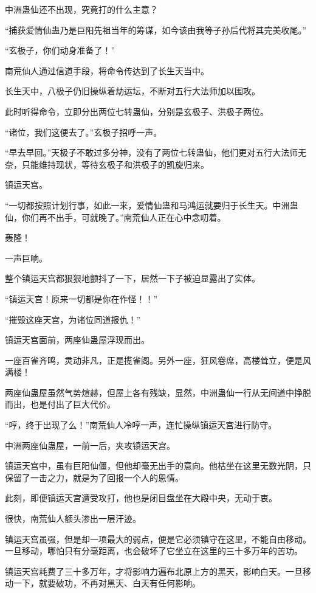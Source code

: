 \begin{this_body}
中洲蛊仙还不出现，究竟打的什么主意？

“捕获爱情仙蛊乃是巨阳先祖当年的筹谋，如今该由我等子孙后代将其完美收尾。”

“玄极子，你们动身准备了！”

南荒仙人通过信道手段，将命令传达到了长生天当中。

长生天中，八极子仍旧操纵着劫运坛，不断对五行大法师加以围攻。

此时听得命令，立即分出两位七转蛊仙，分别是玄极子、洪极子两位。

“诸位，我们这便去了。”玄极子招呼一声。

“早去早回。”天极子不敢过多分神，没有了两位七转蛊仙，他们更对五行大法师无奈，只能维持现状，等待玄极子和洪极子的凯旋归来。

镇运天宫。

“一切都按照计划行事，如此一来，爱情仙蛊和马鸿运就要归于长生天。中洲蛊仙，你们再不出手，可就晚了。”南荒仙人正在心中念叨着。

轰隆！

一声巨响。

整个镇运天宫都狠狠地颤抖了一下，居然一下子被迫显露出了实体。

“镇运天宫！原来一切都是你在作怪！！”

“摧毁这座天宫，为诸位同道报仇！”

镇运天宫面前，两座仙蛊屋浮现而出。

一座百雀齐鸣，灵动非凡，正是揽雀阁。另外一座，狂风卷席，高楼耸立，便是风满楼！

两座仙蛊屋虽然气势煊赫，但屋上各有残缺，显然，中洲蛊仙一行从无间道中挣脱而出，也是付出了巨大代价。

“哼，终于出现了么！”南荒仙人冷哼一声，连忙操纵镇运天宫进行防守。

中洲两座仙蛊屋，一前一后，夹攻镇运天宫。

镇运天宫中，虽有巨阳仙僵，但他却毫无出手的意向。他枯坐在这里无数光阴，只保留了一击之力，就是为了回报一个人的恩情。

此刻，即便镇运天宫遭受攻打，他也是闭目盘坐在大殿中央，无动于衷。

很快，南荒仙人额头渗出一层汗迹。

镇运天宫虽强，但是却一项最大的弱点，便是它必须镇守在这里，不能自由移动。一旦移动，哪怕只有分毫距离，也会破坏了它坐立在这里的三十多万年的苦功。

镇运天宫耗费了三十多万年，才将影响力遍布北原上方的黑天，影响白天。一旦移动一下，就要破功，不再对黑天、白天有任何影响。


\end{this_body}
